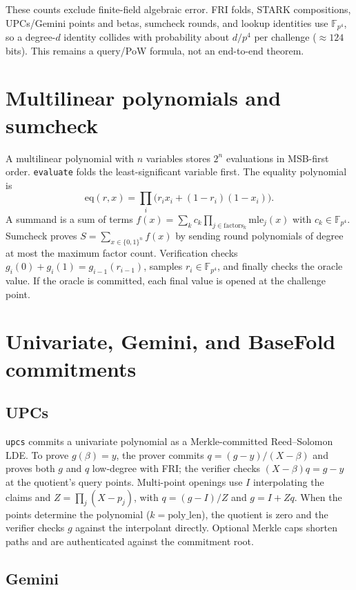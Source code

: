 \documentclass[11pt,a4paper]{article}
\newcommand{\yFpFour}{\mathbb{F}_{p^4}}
\newcommand{\yEq}{\mathrm{eq}}
\begin{document}
These counts exclude finite-field algebraic error. FRI folds, STARK
compositions, UPCs/Gemini points and betas, sumcheck rounds, and lookup
identities use $\yFpFour$, so a degree-$d$ identity collides with probability
about $d/p^4$ per challenge ($\approx124$ bits). This remains a query/PoW
formula, not an end-to-end theorem.

\section{Multilinear polynomials and sumcheck}

A multilinear polynomial with $n$ variables stores $2^n$ evaluations in
MSB-first order. \texttt{evaluate} folds the least-significant variable first.
The equality polynomial is
\[
\yEq(r,x)=\prod_i\bigl(r_ix_i+(1-r_i)(1-x_i)\bigr).
\]
A summand is a sum of terms
$f(x)=\sum_kc_k\prod_{j\in\mathrm{factors}_k}\mathrm{mle}_j(x)$ with
$c_k\in\yFpFour$. Sumcheck proves $S=\sum_{x\in\{0,1\}^n}f(x)$ by sending
round polynomials of degree at most the maximum factor count. Verification
checks $g_i(0)+g_i(1)=g_{i-1}(r_{i-1})$, samples $r_i\in\yFpFour$, and
finally checks the oracle value. If the oracle is committed, each final value
is opened at the challenge point.

\section{Univariate, Gemini, and BaseFold commitments}

\subsection{UPCs}

\texttt{upcs} commits a univariate polynomial as a Merkle-committed
Reed--Solomon LDE. To prove $g(\beta)=y$, the prover commits
$q=(g-y)/(X-\beta)$ and proves both $g$ and $q$ low-degree with FRI; the
verifier checks $(X-\beta)q=g-y$ at the quotient's query points. Multi-point
openings use $I$ interpolating the claims and $Z=\prod_j(X-p_j)$, with
$q=(g-I)/Z$ and $g=I+Zq$. When the points determine the polynomial
($k=\mathrm{poly\_len}$), the quotient is zero and the verifier checks $g$
against the interpolant directly. Optional Merkle caps shorten paths and are
authenticated against the commitment root.

\subsection{Gemini}
\end{document}
